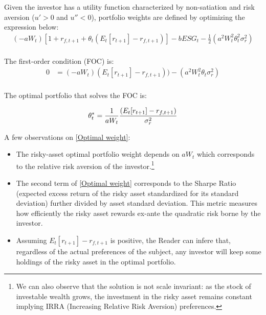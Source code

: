 \documentclass[12pt]{article}
\begin{document}
	Given the investor has a utility function characterized by non-satiation and risk aversion ($u'>0$ and $u''<0$), portfolio weights are defined by optimizing the expression below: \vspace{-3em}\\
	
	\begin{align*}
		(-aW_t) [1 + r_{f,t+1} + \theta_t(E_{t}[r_{t+1}]-r_{f, t+1})] - bESG_t - \frac{1}{2}(a^2W_t^2\theta_t^2\sigma_r^2) \\
	\end{align*} \vspace{-3em}
	
	The first-order condition (FOC) is: \vspace{-2.5em}\\
	
	\begin{align*}
		0 &= (-aW_t)(E_{t}[r_{t+1}]-r_{f, t+1})) - (a^2W_t^2\theta_t\sigma_r^2) \\
	\end{align*} \vspace{-3em}
	
	The optimal portfolio that solves the FOC is: 
	
	\begin{equation} \label{Optimal weight}
		\theta_t^* = \frac{1}{aW_t}\frac{(E_{t}[r_{t+1}]-r_{f, t+1})}{\sigma_r^2} \\
	\end{equation}
	
	A few observations on \ref{Optimal weight}:
	\begin{itemize}
		\item The risky-asset optimal portfolio weight depends on $aW_t$ which corresponds to the relative risk aversion of the investor.\footnote {We can also observe that the solution is not scale invariant: as the stock of investable wealth grows, the investment in the risky asset remains constant implying IRRA (Increasing Relative Risk Aversion) preferences.}
		\item The second term of \ref{Optimal weight} corresponds to the Sharpe Ratio (expected excess return of the risky asset standardized for its standard deviation) further divided by asset standard deviation. This metric measures how efficiently the risky asset rewards ex-ante the quadratic risk borne by the investor.
		\item Assuming $E_{t}[r_{t+1}] - r_{f, t+1}$ is positive, the Reader can infere that, regardless of the actual preferences of the subject, any investor will keep some holdings of the risky asset in the optimal portfolio.\\     
	\end{itemize}
	
\end{document}
